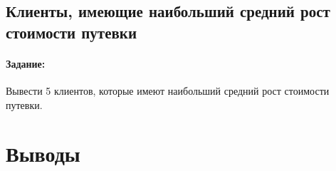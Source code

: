 
\subsection{Клиенты, имеющие наибольший средний рост стоимости путевки}

\paragraph{Задание:} Вывести 5 клиентов, которые имеют наибольший средний рост стоимости путевки.


\section{Выводы}




